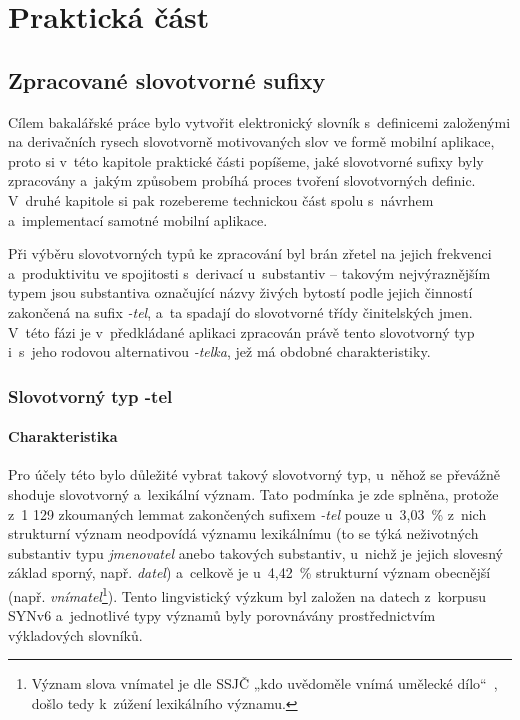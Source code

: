 \part{Praktická část}

\hypertarget{zpracovanuxe9-slovotvornuxe9-sufixy}{%
\chapter{Zpracované slovotvorné
sufixy}\label{zpracovanuxe9-slovotvornuxe9-sufixy}}

Cílem bakalářské práce bylo vytvořit elektronický slovník s~definicemi
založenými na derivačních rysech slovotvorně motivovaných slov ve formě
mobilní aplikace, proto si v~této kapitole praktické části popíšeme,
jaké slovotvorné sufixy byly zpracovány a~jakým způsobem probíhá proces
tvoření slovotvorných definic. V~druhé kapitole si pak rozebereme
technickou část spolu s~návrhem a~implementací samotné mobilní aplikace.

Při výběru slovotvorných typů ke zpracování byl brán zřetel na jejich
frekvenci a~produktivitu ve spojitosti s~derivací u~substantiv --
takovým nejvýraznějším typem jsou substantiva označující názvy živých
bytostí podle jejich činností zakončená na sufix \emph{-tel}, a~ta
spadají do slovotvorné třídy činitelských jmen.
\parencite[17]{dokulil67} V~této fázi je v~předkládané aplikaci
zpracován právě tento slovotvorný typ i~s~jeho rodovou alternativou
\emph{-telka}, jež má obdobné charakteristiky.

\hypertarget{slovotvornuxfd-typ--tel}{%
\section{Slovotvorný typ -tel}\label{slovotvornuxfd-typ--tel}}

\hypertarget{charakteristika}{%
\subsection{Charakteristika}\label{charakteristika}}

Pro účely této bylo důležité vybrat takový slovotvorný typ, u~něhož se
převážně shoduje slovotvorný a~lexikální význam. Tato podmínka je zde
splněna, protože z~1 129 zkoumaných lemmat zakončených sufixem
\emph{-tel} pouze u~3,03~\% z~nich strukturní význam neodpovídá významu
lexikálnímu (to se týká neživotných substantiv typu \emph{jmenovatel}
anebo takových substantiv, u~nichž je jejich slovesný základ sporný,
např. \emph{datel}) a~celkově je u~4,42~\% strukturní význam obecnější
(např.
\emph{vnímatel}\footnote{Význam slova vnímatel je dle SSJČ „kdo uvědoměle vnímá umělecké dílo“~\parencite{ssjc}, došlo tedy k~zúžení lexikálního významu.}).
Tento lingvistický výzkum byl založen na datech z~korpusu SYNv6
a~jednotlivé typy významů byly porovnávány prostřednictvím výkladových
slovníků.~\parencite{adri}


